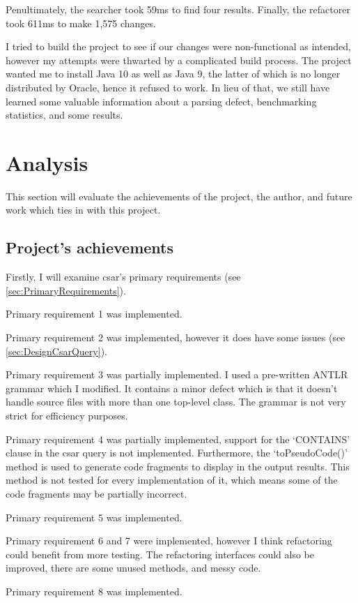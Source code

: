 \documentclass[12pt, letterpaper]{article}
\begin{document}
Penultimately, the searcher took 59ms to find four results.
Finally, the refactorer took 611ms to make 1,575 changes.

I tried to build the project to see if our changes were non-functional as intended, however my attempts were thwarted by a complicated build process.
The project wanted me to install Java 10 as well as Java 9, the latter of which is no longer distributed by Oracle, hence it refused to work.
In lieu of that, we still have learned some valuable information about a parsing defect, benchmarking statistics, and some results.

\section{Analysis}
This section will evaluate the achievements of the project, the author, and future work which ties in with this project.

\subsection{Project's achievements}
Firstly, I will examine csar's primary requirements (see \ref{sec:PrimaryRequirements}).

Primary requirement 1 was implemented. 

Primary requirement 2 was implemented, however it does have some issues (see \ref{sec:DesignCsarQuery}).

Primary requirement 3 was partially implemented.
I used a pre-written ANTLR grammar which I modified. 
It contains a minor defect which is that it doesn't handle source files with more than one top-level class.
The grammar is not very strict for efficiency purposes.

Primary requirement 4 was partially implemented, support for the `CONTAINS' clause in the csar query is not implemented.
Furthermore, the `toPseudoCode()' method is used to generate code fragments to display in the output results.
This method is not tested for every implementation of it, which means some of the code fragments may be partially incorrect.

Primary requirement 5 was implemented.

Primary requirement 6 and 7 were implemented, however I think refactoring could benefit from more testing.
The refactoring interfaces could also be improved, there are some unused methods, and messy code.

Primary requirement 8 was implemented.
\end{document}
